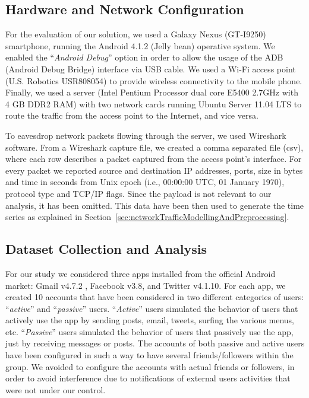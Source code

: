 \documentclass{acm_proc_article-sp}
\begin{document}
\subsection{Hardware and Network Configuration}
\label{HDWandNetworkConfiguration}



For the evaluation of our solution, we used a Galaxy Nexus (GT-I9250) smartphone, running the Android 4.1.2 (Jelly bean) 
operative system.
We enabled the ``\emph{Android Debug}'' option in order to allow the usage of the ADB (Android Debug Bridge) interface via USB cable. 
We used a Wi-Fi access point 
(U.S. Robotics USR808054) to provide wireless connectivity to the mobile phone. 
Finally, we used a server (Intel Pentium Processor dual core E5400 2.7GHz with 4 GB DDR2 RAM)
with two network cards running Ubuntu Server 11.04 LTS to route the traffic from the access point to the Internet, and vice versa. 

To eavesdrop network packets flowing through the server, we used Wireshark 
software. From a Wireshark capture file, we 
created a comma separated file (csv), where each row describes a
packet captured from the access point's interface. 
For every packet we reported source and destination IP addresses, ports, size in bytes and
time in seconds from Unix epoch (i.e., 00:00:00 UTC, 01 January 1970), protocol type and TCP/IP flags. Since the payload is not relevant to our analysis, it has been omitted. 
This data have been then used to generate the time series as 
explained in Section~\ref{sec:networkTrafficModellingAndPreprocessing}.


\subsection{Dataset Collection and Analysis}
\label{datacollection}

For our study we considered three apps installed from the official Android market: Gmail v4.7.2 , Facebook v3.8, and Twitter v4.1.10.
For each app, we created 10 accounts that have been considered in two different categories of users: ``\emph{active}'' and 
``\emph{passive}'' users. ``\emph{Active}'' users simulated the behavior of 
users that actively use the app by sending posts, email, tweets, surfing 
the various menus, etc. ``\emph{Passive}'' users simulated the behavior of 
users that passively use the app, just by receiving messages or posts. 
The accounts of both passive and active users have been configured in such a way 
to have several friends/followers within the group. We avoided to 
configure the accounts with actual friends or followers, in order to avoid 
interference
due to notifications of external users activities that were not under our control.
\end{document}

